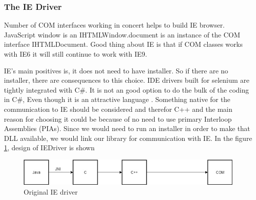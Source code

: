 \documentclass[article,type=msc,colorback,accentcolor=tud9c,twoside,11pt]{tudthesis}
\begin{document}
\subsubsection{The IE Driver}
Number of COM interfaces working in concert helps to build IE browser. JavaScript window is an IHTMLWindow.document is an instance of the COM interface IHTMLDocument. Good thing about IE is that if COM classes works with IE6 it will still continue to work with IE9.

IE's main positives is, it does not need to have installer. So if there are no installer, there are consequences to this choice. IDE drivers built for selenium are tightly integrated with C\#. It is not an good option to do the bulk of the coding in C\#, Even though it is an attractive language . Something native for the communication to IE should be considered and therefor C++ and the main reason for choosing it could be because of no need to use primary Interloop Assemblies (PIAs). Since we would need to run an installer in order to make that DLL available, we would link our library for communication with IE. In the figure  \ref{fig:OriginalIEdriver}, design of IEDriver is shown 
\begin{figure}[h]
	\centering
	\includegraphics[scale=0.6]{OriginalIEdriver}
	\caption{Original IE driver}
	\label{fig:OriginalIEdriver}
\end{figure}
\end{document}
